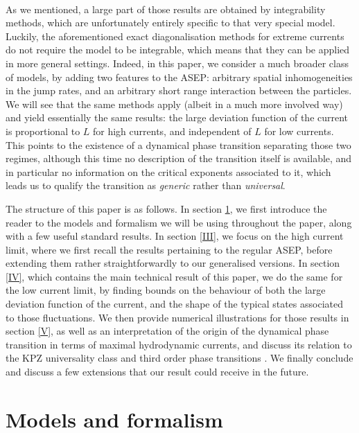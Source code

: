 \documentclass[aps,pre,onecolumn,showpacs,showkeys,a4paper]{revtex4-1}
\begin{document}
~

As we mentioned, a large part of those results are obtained by integrability methods, which are unfortunately entirely specific to that very special model. Luckily, the aforementioned exact diagonalisation methods for extreme currents do not require the model to be integrable, which means that they can be applied in more general settings. Indeed, in this paper, we consider a much broader class of models, by adding two features to the ASEP: arbitrary spatial inhomogeneities in the jump rates, and an arbitrary short range interaction between the particles. We will see that the same methods apply (albeit in a much more involved way) and yield essentially the same results: the large deviation function of the current is proportional to $L$ for high currents, and independent of $L$ for low currents. This points to the existence of a dynamical phase transition separating those two regimes, although this time no description of the transition itself is available, and in particular no information on the critical exponents associated to it, which leads us to qualify the transition as \textit{generic} rather than \textit{universal}.

The structure of this paper is as follows. In section \ref{II}, we first introduce the reader to the models and formalism we will be using throughout the paper, along with a few useful standard results. In section \ref{III}, we focus on the high current limit, where we first recall the results pertaining to the regular ASEP, before extending them rather straightforwardly to our generalised versions. In section \ref{IV}, which contains the main technical result of this paper, we do the same for the low current limit, by finding bounds on the behaviour of both the large deviation function of the current, and the shape of the typical states associated to those fluctuations. We then provide numerical illustrations for those results in section \ref{V}, as well as an interpretation of the origin of the dynamical phase transition in terms of maximal hydrodynamic currents, and discuss its relation to the KPZ universality class \cite{BenArous2011} and third order phase transitions \cite{LeDoussal2016}. We finally conclude and discuss a few extensions that our result could receive in the future.


\newpage

\section{Models and formalism}
\label{II}
\end{document}
